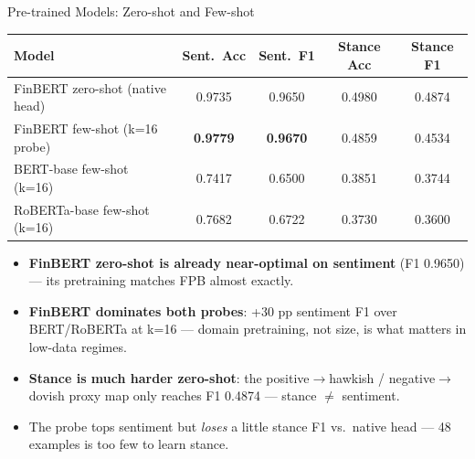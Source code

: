 \documentclass[10pt, aspectratio=169]{beamer}
\begin{document}
\begin{frame}{Pre-trained Models: Zero-shot and Few-shot}
    \centering
    {\small
    \begin{tabular}{lcccc}
        \toprule
        \textbf{Model} & \textbf{Sent.\ Acc} & \textbf{Sent.\ F1} & \textbf{Stance Acc} & \textbf{Stance F1} \\
        \midrule
        FinBERT zero-shot (native head)~\cite{araci2019finbert}    & 0.9735 & 0.9650 & 0.4980 & 0.4874 \\
        \rowcolor{UNSWYellow!30}
        FinBERT few-shot (k=16 probe)                               & \textbf{0.9779} & \textbf{0.9670} & 0.4859 & 0.4534 \\
        BERT-base few-shot (k=16)~\cite{devlin2019bert}             & 0.7417 & 0.6500 & 0.3851 & 0.3744 \\
        RoBERTa-base few-shot (k=16)                                & 0.7682 & 0.6722 & 0.3730 & 0.3600 \\
        \bottomrule
    \end{tabular}
    }

    \vspace{0.6em}
    \begin{itemize}\setlength{\itemsep}{1pt}
        \item \textbf{FinBERT zero-shot is already near-optimal on sentiment} (F1 0.9650) --- its pretraining matches FPB almost exactly.
        \item \textbf{FinBERT dominates both probes}: +30 pp sentiment F1 over BERT/RoBERTa at k=16 --- domain pretraining, not size, is what matters in low-data regimes.
        \item \textbf{Stance is much harder zero-shot}: the positive$\rightarrow$hawkish / negative$\rightarrow$dovish proxy map only reaches F1 0.4874 --- stance $\neq$ sentiment.
        \item The probe tops sentiment but \textit{loses} a little stance F1 vs.\ native head --- 48 examples is too few to learn stance.
    \end{itemize}
\end{frame}
\end{document}

